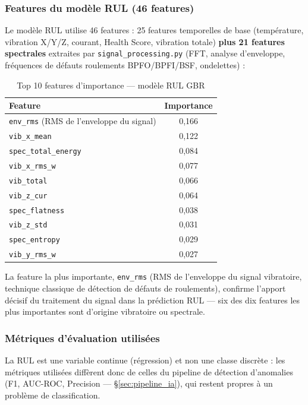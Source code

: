 \documentclass[12pt,a4paper]{report}
\begin{document}
\subsubsection{Features du modèle RUL (46 features)}

Le modèle RUL utilise 46 features : 25 features temporelles de base (température,
vibration X/Y/Z, courant, Health Score, vibration totale) \textbf{plus 21 features
spectrales} extraites par \texttt{signal\_processing.py} (FFT, analyse d'enveloppe,
fréquences de défauts roulements BPFO/BPFI/BSF, ondelettes) :

\begin{table}[H]
\centering
\caption{Top 10 features d'importance — modèle RUL GBR}
\begin{tabular}{lc}
\toprule
\textbf{Feature} & \textbf{Importance} \\
\midrule
\texttt{env\_rms} (RMS de l'enveloppe du signal) & 0,166 \\
\texttt{vib\_x\_mean}            & 0,122 \\
\texttt{spec\_total\_energy}     & 0,084 \\
\texttt{vib\_x\_rms\_w}          & 0,077 \\
\texttt{vib\_total}              & 0,066 \\
\texttt{vib\_z\_cur}             & 0,064 \\
\texttt{spec\_flatness}          & 0,038 \\
\texttt{vib\_z\_std}             & 0,031 \\
\texttt{spec\_entropy}           & 0,029 \\
\texttt{vib\_y\_rms\_w}          & 0,027 \\
\bottomrule
\end{tabular}
\end{table}

\noindent La feature la plus importante, \texttt{env\_rms} (RMS de l'enveloppe du signal
vibratoire, technique classique de détection de défauts de roulements), confirme l'apport
décisif du traitement du signal dans la prédiction RUL — six des dix features les plus
importantes sont d'origine vibratoire ou spectrale.

\subsubsection{Métriques d'évaluation utilisées}
\label{subsec:metriques_rul}

La RUL est une variable continue (régression) et non une classe discrète : les métriques
utilisées diffèrent donc de celles du pipeline de détection d'anomalies (F1, AUC-ROC,
Precision — \S\ref{sec:pipeline_ia}), qui restent propres à un problème de classification.
\end{document}
